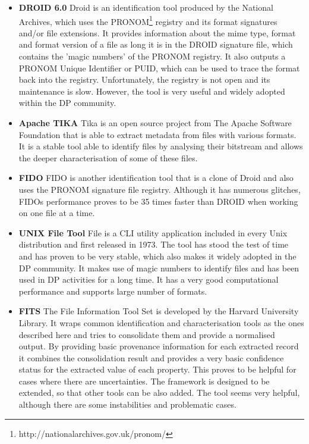 \begin{itemize}
\item \textbf{DROID 6.0}\newline
Droid is an identification tool produced by the National Archives, which uses the PRONOM\footnote{http://nationalarchives.gov.uk/pronom/} registry and its format signatures and/or file extensions. It provides information about the mime type, format and format version of a file as long it is in the DROID signature file, which contains the 'magic numbers' of the PRONOM registry. It also outputs a PRONOM Unique Identifier or PUID, which can be used to trace the format back into the registry.
Unfortunately, the registry is not open and its maintenance is slow. However, the tool is very useful and widely adopted within the DP community.

\item \textbf{Apache TIKA}\newline
Tika is an open source project from The Apache Software Foundation that is able to extract metadata from files with various formats. It is a stable tool able to identify files by analysing their bitstream and allows the deeper characterisation of some of these files.  

\item \textbf{FIDO}\newline
FIDO is another identification tool that is a clone of Droid and also uses the PRONOM signature file registry. Although it has numerous glitches, FIDOs performance proves to be 35 times faster than DROID when working on one file at a time.

\item \textbf{UNIX File Tool}\newline
File is a CLI utility application included in every Unix distribution and first released in 1973. The tool has stood the test of time and has proven to be very stable, which also makes it widely adopted in the DP community. It makes use of magic numbers to identify files and has been used in DP activities for a long time. It has a very good computational performance and supports large number of formats.

\item \textbf{FITS} \newline
The File Information Tool Set is developed by the Harvard University Library. It wraps common identification and characterisation tools as the ones described here and tries to consolidate them and provide a normalised output. By providing basic provenance information for each extracted record it combines the consolidation result and provides a very basic confidence status for the extracted value of each property. This proves to be helpful for cases where there are uncertainties. The framework is designed to be extended, so that other tools can be also added. The tool seems very helpful, although there are some instabilities and problematic cases.


\end{itemize}
